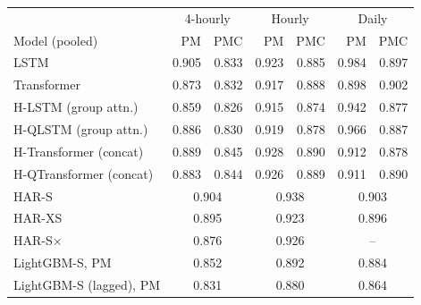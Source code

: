 \begin{tabular}{lrrrrrr}
\toprule
 & \multicolumn{2}{c}{4-hourly} & \multicolumn{2}{c}{Hourly} & \multicolumn{2}{c}{Daily} \\
Model (pooled) & PM & PMC & PM & PMC & PM & PMC \\
\midrule
LSTM & 0.905 & 0.833 & 0.923 & 0.885 & 0.984 & 0.897 \\
Transformer & 0.873 & 0.832 & 0.917 & 0.888 & 0.898 & 0.902 \\
H-LSTM (group attn.) & 0.859 & 0.826 & 0.915 & 0.874 & 0.942 & 0.877 \\
H-QLSTM (group attn.) & 0.886 & 0.830 & 0.919 & 0.878 & 0.966 & 0.887 \\
H-Transformer (concat) & 0.889 & 0.845 & 0.928 & 0.890 & 0.912 & 0.878 \\
H-QTransformer (concat) & 0.883 & 0.844 & 0.926 & 0.889 & 0.911 & 0.890 \\
\midrule
HAR-S & \multicolumn{2}{c}{0.904} & \multicolumn{2}{c}{0.938} & \multicolumn{2}{c}{0.903} \\
HAR-XS & \multicolumn{2}{c}{0.895} & \multicolumn{2}{c}{0.923} & \multicolumn{2}{c}{0.896} \\
HAR-S$\times$ & \multicolumn{2}{c}{0.876} & \multicolumn{2}{c}{0.926} & \multicolumn{2}{c}{--} \\
LightGBM-S, PM & \multicolumn{2}{c}{0.852} & \multicolumn{2}{c}{0.892} & \multicolumn{2}{c}{0.884} \\
LightGBM-S (lagged), PM & \multicolumn{2}{c}{0.831} & \multicolumn{2}{c}{0.880} & \multicolumn{2}{c}{0.864} \\
\bottomrule
\end{tabular}
